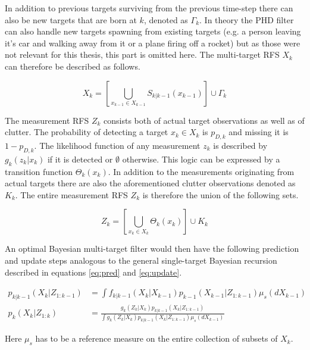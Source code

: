 In addition to previous targets surviving from the previous time-step there can also be new targets that are born at $k$, denoted as $\Gamma_k$. In theory the PHD filter can also handle new targets spawning from existing targets (e.g. a person leaving it's car and walking away from it or a plane firing off a rocket) but as those were not relevant for this thesis, this part is omitted here. The multi-target RFS $X_k$ can therefore be described as follows.

\begin{equation}
    X_k = \left[\bigcup\limits_{x_{k-1} \in X_{k-1}} S_{k|k-1}(x_{k-1})\right] \cup \Gamma_k
\end{equation}

The measurement RFS $Z_k$ consists both of actual target observations as well as of clutter. The probability of detecting a target $x_k \in X_k$ is $p_{D,k}$ and missing it is $1-p_{D,k}$. The likelihood function of any measurement $z_k$ is described by $g_k(z_k|x_k)$ if it is detected or $\emptyset$ otherwise. This logic can be expressed by a transition function $\Theta_k(x_k)$. In addition to the measurements originating from actual targets there are also the aforementioned clutter observations denoted as $K_k$. The entire measurement RFS $Z_k$ is therefore the union of the following sets.

\begin{equation}
    Z_k = \left[\bigcup\limits_{x_{k} \in X_{k}} \Theta_{k}(x_{k})\right] \cup K_k
\end{equation}

An optimal Bayesian multi-target filter would then have the following prediction and update steps analogous to the general single-target Bayesian recursion described in equations \eqref{eq:pred} and \eqref{eq:update}.

\begin{equation}
\begin{split}
    p_{k|k-1}(X_k|Z_{1:k-1}) &= \int f_{k|k-1}(X_k|X_{k-1})p_{k-1}(X_{k-1}|Z_{1:k-1})\mu_s(dX_{k-1})\\
    p_{k}(X_k|Z_{1:k}) &= \frac{g_{k}(Z_k|X_{k})p_{k|k-1}(X_k|Z_{1:k-1})}{\int g_{k}(Z_k|X_{k})p_{k|k-1}(X_k|Z_{1:k-1})\mu_s(dX_{k-1})}
\end{split}
\end{equation}

Here $\mu_s$ has to be a reference measure on the entire collection of subsets of $X_k$.\cite{Vo2006PHD}

